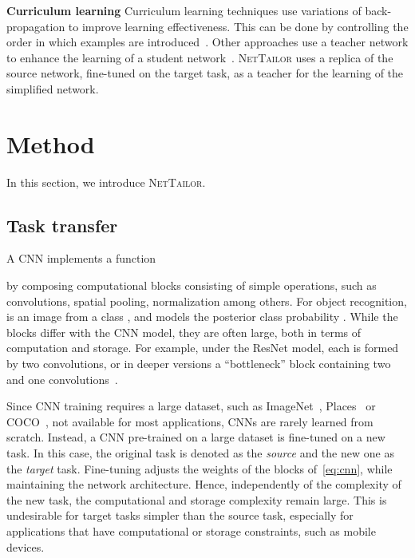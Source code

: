 \documentclass[10pt,twocolumn,letterpaper]{article}
\begin{document}
\noindent
{\bf Curriculum learning} Curriculum learning techniques use variations of back-propagation to improve learning effectiveness. This can be done by controlling the order in which examples are introduced~\cite{bengio2009curriculum}. Other approaches use a teacher network to enhance the learning of a student network~\cite{fan2018learning,matiisen2017teacher}. \textsc{NetTailor} uses a replica of the source network, fine-tuned on the target task, as a teacher for the learning of the simplified network.


 
\vspace{-3pt}
\section{Method}
\vspace{-3pt}
In this section, we introduce \textsc{NetTailor}.

\subsection{Task transfer}
\vspace{-3pt}

A CNN implements a function 

by composing  computational blocks  consisting of simple operations, such as convolutions, spatial pooling, normalization among others.
For object recognition,  is an image from a class , and  models the posterior class probability .
While the blocks  differ with the CNN model, they are often large, both in terms of computation and storage. 
For example, under the ResNet model, each  is formed by two  convolutions, or in deeper versions a ``bottleneck'' block containing two  and one  convolutions~\cite{he2016deep}.

Since CNN training requires a large dataset, such as ImageNet~\cite{imagenet}, Places~\cite{places} or COCO~\cite{coco}, not available for most applications, CNNs are rarely learned from scratch. 
Instead, a CNN pre-trained on a large dataset is fine-tuned on a new task. In this case, the original task is denoted as the {\it source\/}  and the new one as the {\it target\/} task. Fine-tuning adjusts the weights of the blocks of~\eqref{eq:cnn}, while maintaining the network architecture.
Hence, independently of the complexity of the new task, the computational and storage complexity remain large. This is undesirable for target tasks simpler than the source task, especially for applications that have computational or storage constraints, such as mobile devices. 
\end{document}
